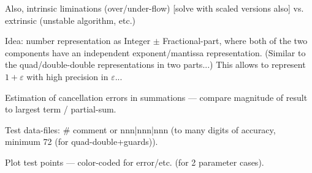 \documentclass[10pt,dvipdfmx,letterpaper,twoside]{article}
\let\eps=\varepsilon
\begin{document}
Also, intrinsic liminations (over/under-flow) [solve with scaled versions also]
vs. extrinsic (unstable algorithm, etc.)

Idea: number representation as Integer $\pm$ Fractional-part, where both of the two components
have an independent exponent/mantissa representation.  (Similar to the quad/double-double representations
in two parts...)  This allows to represent $1+\eps$ with high precision in $\eps$...

Estimation of cancellation errors in summations --- compare magnitude of result to largest term / partial-sum.

Test data-files: \# comment or nnn|nnn|nnn (to many digits of accuracy, minimum 72 (for quad-double+guards)).

Plot test points --- color-coded for error/etc. (for 2 parameter cases).

%
\end{document}
